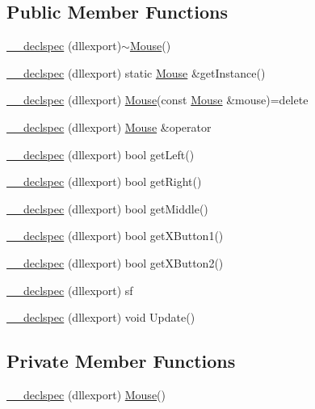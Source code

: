 \subsection*{Public Member Functions}
\begin{DoxyCompactItemize}
\item 
\hyperlink{class_mouse_a5f8cad462f144fedf82bc54f1566e50f}{\-\_\-\-\_\-declspec} (dllexport)$\sim$\hyperlink{class_mouse}{Mouse}()
\item 
\hyperlink{class_mouse_a20435d528429f91f08e2c3bd6f2e8b43}{\-\_\-\-\_\-declspec} (dllexport) static \hyperlink{class_mouse}{Mouse} \&get\-Instance()
\item 
\hyperlink{class_mouse_a270b06a79e098e62f8a781bc069e8442}{\-\_\-\-\_\-declspec} (dllexport) \hyperlink{class_mouse}{Mouse}(const \hyperlink{class_mouse}{Mouse} \&mouse)=delete
\item 
\hyperlink{class_mouse_a9a843be0900007698eb252574b66aaf4}{\-\_\-\-\_\-declspec} (dllexport) \hyperlink{class_mouse}{Mouse} \&operator
\item 
\hyperlink{class_mouse_a8b71e01cd362bfac3b49c8f7060b326a}{\-\_\-\-\_\-declspec} (dllexport) bool get\-Left()
\item 
\hyperlink{class_mouse_ac38020f21b0de83806790c3d3acb5971}{\-\_\-\-\_\-declspec} (dllexport) bool get\-Right()
\item 
\hyperlink{class_mouse_a749c6251455f83e534e34f09b999960d}{\-\_\-\-\_\-declspec} (dllexport) bool get\-Middle()
\item 
\hyperlink{class_mouse_a1ed05b28cf22053dcbf7f3eb798426b6}{\-\_\-\-\_\-declspec} (dllexport) bool get\-X\-Button1()
\item 
\hyperlink{class_mouse_a8e1cefd84a6ab56a54f5857a728ac7b9}{\-\_\-\-\_\-declspec} (dllexport) bool get\-X\-Button2()
\item 
\hyperlink{class_mouse_aed195e7d0d2d1c8a9a210325e6b7035c}{\-\_\-\-\_\-declspec} (dllexport) sf
\item 
\hyperlink{class_mouse_a05f36b07846e423c869ac1246fd131a2}{\-\_\-\-\_\-declspec} (dllexport) void Update()
\end{DoxyCompactItemize}
\subsection*{Private Member Functions}
\begin{DoxyCompactItemize}
\item 
\hyperlink{class_mouse_a3a7c4f8d10b38469887b51c324e58b41}{\-\_\-\-\_\-declspec} (dllexport) \hyperlink{class_mouse}{Mouse}()
\end{DoxyCompactItemize}
